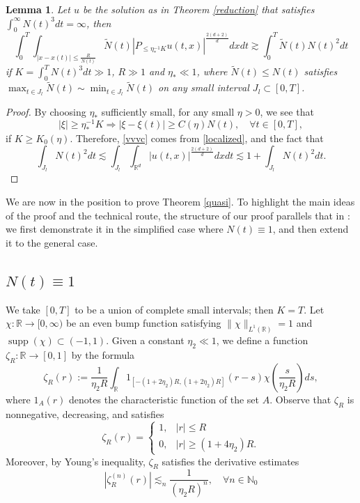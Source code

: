 \documentclass[reqno,11pt]{amsart}
\theoremstyle{plain}
\newtheorem{lemma}[theorem]{Lemma}
\theoremstyle{definition}
\numberwithin{equation}{section}
\numberwithin{theorem}{section}
\def\geq{\geqslant}
\def\leq{\leqslant}
\def\R{\mathbb{R}}
\begin{document}
\begin{lemma}\label{quasisolitonlemma2}
Let $u$ be the solution as in Theorem \ref{reduction} that satisfies $\int_{0}^{\infty} N(t)^{3} d t= \infty$, then
    \begin{equation}\label{vvvc}
        \int_0^T\int_{|x-x(t)|\leq\frac{R}{N(t)}}\tilde{N}(t) |P_{\leq \eta_{\ast}^{-1}K}u(t,x)|^{\frac{2(d+2)}{d}} dx dt\gtrsim \int_0^T\tilde{N}(t)N(t)^2dt
    \end{equation}
    if $K=\int_0^TN(t)^3dt\gg1$, $R\gg1$ and $\eta_{\ast}\ll 1$, where  $\tilde{N}(t)\leq N(t)$ satisfies $\max_{t\in J_l}\tilde{N}(t)\sim \min_{t\in J_l}\tilde{N}(t)$ on any small interval $J_l\subset [0,T]$.
 \end{lemma} 
    
    \begin{proof}
        By choosing $\eta_{\ast}$ sufficiently small, for any small $\eta>0$, we see that 
        \[
       |\xi|\geq \eta_{\ast}^{-1}K\Longrightarrow |\xi-\xi(t)|\geq C(\eta)N(t),\quad \forall t\in [0,T],
        \]
        if $K\geq K_0(\eta)$. Therefore, \eqref{vvvc} comes from \eqref{localized}, and the fact that  
        \[
        \int_{J_l} N(t)^2 dt\lesssim\int_{J_l}\int_{\R^d} |u(t,x)|^{\frac{2(d+2)}{d}}dxdt\lesssim  1+\int_{J_l} N(t)^2 dt.
        \]
    \end{proof}

We are now in the position to prove Theorem \ref{quasi}. To highlight the main ideas of the proof and the technical route, the structure of our proof parallels that in \cite{Dodson-Adv}: we first demonstrate it in the simplified case where $N(t)\equiv1$, and then extend it to the general case.
\subsection{$N(t)\equiv1$}
We take $[0,T]$ to be a union of complete small intervals; then $K=T$.
Let  $\chi: \mathbb{R} \rightarrow[0, \infty)$ be an even bump function satisfying $\|\chi\|_{L^{1}(\mathbb{R})}=1$ and $\operatorname{supp}(\chi) \subset(-1,1)$. Given a constant $\eta_2\ll1$, we define a function $\zeta_{R}: \mathbb{R} \rightarrow[0,1]$ by the formula
\begin{equation}\label{equ:zetaRdef}
\zeta_{R}(r):=\frac{1}{\eta_{2} R} \int_{\mathbb{R}} 1_{\left[-\left(1+2 \eta_{2}\right) R,\left(1+2 \eta_{2}\right) R\right]}(r-s) \chi\left(\frac{s}{\eta_{2} R}\right) ds, 
\end{equation}
where $1_A(r)$ denotes the characteristic function of the set $A.$
 Observe that $\zeta_{R}$ is nonnegative, decreasing, and satisfies
\[
\zeta_{R}(r)=\left\{\begin{array}{ll}
1, & |r| \leq R \\
0, & |r| \geq\left(1+4 \eta_{2}\right) R.
\end{array} \right.
\]
Moreover, by Young's inequality, $\zeta_{R}$ satisfies the derivative estimates
\begin{equation}\label{mor1}
\left|\zeta_{R}^{(n)}(r)\right| \lesssim_n \frac{1}{\left(\eta_{2} R\right)^{n}}, \quad \forall n \in \mathbb{N}_{0} 
\end{equation}
\end{document}
